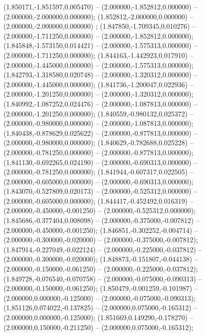  (1.850171,-1.851597,0.005470) -- (2.000000,-1.852812,0.000000) -- (2.000000,-2.000000,0.000000);
 (1.852812,-2.000000,0.000000) -- (2.000000,-2.000000,0.000000) ;
 (1.847850,-1.709345,0.010276) -- (2.000000,-1.711250,0.000000) -- (2.000000,-1.852812,0.000000);
 (1.845848,-1.573150,0.014421) -- (2.000000,-1.575313,0.000000) -- (2.000000,-1.711250,0.000000);
 (1.844163,-1.442923,0.017910) -- (2.000000,-1.445000,0.000000) -- (2.000000,-1.575313,0.000000);
 (1.842793,-1.318580,0.020748) -- (2.000000,-1.320312,0.000000) -- (2.000000,-1.445000,0.000000);
 (1.841736,-1.200047,0.022936) -- (2.000000,-1.201250,0.000000) -- (2.000000,-1.320312,0.000000);
 (1.840992,-1.087252,0.024476) -- (2.000000,-1.087813,0.000000) -- (2.000000,-1.201250,0.000000);
 (1.840559,-0.980132,0.025372) -- (2.000000,-0.980000,0.000000) -- (2.000000,-1.087813,0.000000);
 (1.840438,-0.878629,0.025622) -- (2.000000,-0.877813,0.000000) -- (2.000000,-0.980000,0.000000);
 (1.840629,-0.782688,0.025228) -- (2.000000,-0.781250,0.000000) -- (2.000000,-0.877813,0.000000);
 (1.841130,-0.692265,0.024190) -- (2.000000,-0.690313,0.000000) -- (2.000000,-0.781250,0.000000);
 (1.841944,-0.607317,0.022505) -- (2.000000,-0.605000,0.000000) -- (2.000000,-0.690313,0.000000);
 (1.843070,-0.527809,0.020173) -- (2.000000,-0.525312,0.000000) -- (2.000000,-0.605000,0.000000);
 (1.844417,-0.452492,0.016319) -- (2.000000,-0.450000,-0.001250) -- (2.000000,-0.525312,0.000000);
 (1.845686,-0.377404,0.008098) -- (2.000000,-0.375000,-0.007812) -- (2.000000,-0.450000,-0.001250);
 (1.846851,-0.302252,-0.004714) -- (2.000000,-0.300000,-0.020000) -- (2.000000,-0.375000,-0.007812);
 (1.847914,-0.227049,-0.022124) -- (2.000000,-0.225000,-0.037812) -- (2.000000,-0.300000,-0.020000);
 (1.848873,-0.151807,-0.044138) -- (2.000000,-0.150000,-0.061250) -- (2.000000,-0.225000,-0.037812);
 (1.849728,-0.076540,-0.070758) -- (2.000000,-0.075000,-0.090313) -- (2.000000,-0.150000,-0.061250);
 (1.850479,-0.001259,-0.101987) -- (2.000000,0.000000,-0.125000) -- (2.000000,-0.075000,-0.090313);
 (1.851126,0.074022,-0.137825) -- (2.000000,0.075000,-0.165312) -- (2.000000,0.000000,-0.125000);
 (1.851669,0.149290,-0.178270) -- (2.000000,0.150000,-0.211250) -- (2.000000,0.075000,-0.165312);
